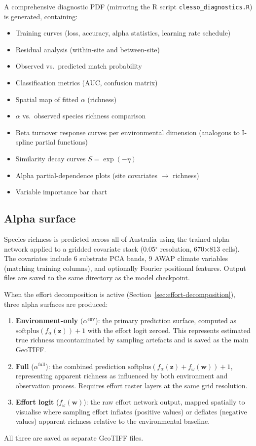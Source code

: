 \documentclass{article}
\begin{document}
A comprehensive diagnostic PDF (mirroring the R script \texttt{clesso\_diagnostics.R}) is generated, containing:
\begin{itemize}
    \item Training curves (loss, accuracy, alpha statistics, learning rate schedule)
    \item Residual analysis (within-site and between-site)
    \item Observed vs.\ predicted match probability
    \item Classification metrics (AUC, confusion matrix)
    \item Spatial map of fitted $\alpha$ (richness)
    \item $\alpha$ vs.\ observed species richness comparison
    \item Beta turnover response curves per environmental dimension (analogous to I-spline partial functions)
    \item Similarity decay curves $S = \exp(-\eta)$
    \item Alpha partial-dependence plots (site covariates $\to$ richness)
    \item Variable importance bar chart
\end{itemize}

\subsection{Alpha surface}

Species richness is predicted across all of Australia using the trained alpha network applied to a gridded covariate stack (0.05$^\circ$ resolution, 670$\times$813 cells). The covariates include 6 substrate PCA bands, 9 AWAP climate variables (matching training columns), and optionally Fourier positional features. Output files are saved to the same directory as the model checkpoint.

When the effort decomposition is active (Section~\ref{sec:effort-decomposition}), three alpha surfaces are produced:
\begin{enumerate}
    \item \textbf{Environment-only} ($\alpha^{\text{env}}$): the primary prediction surface, computed as $\text{softplus}(f_\alpha(\mathbf{z})) + 1$ with the effort logit zeroed. This represents estimated true richness uncontaminated by sampling artefacts and is saved as the main GeoTIFF.
    \item \textbf{Full} ($\alpha^{\text{full}}$): the combined prediction $\text{softplus}(f_\alpha(\mathbf{z}) + f_\omega(\mathbf{w})) + 1$, representing apparent richness as influenced by both environment and observation process. Requires effort raster layers at the same grid resolution.
    \item \textbf{Effort logit} ($f_\omega(\mathbf{w})$): the raw effort network output, mapped spatially to visualise where sampling effort inflates (positive values) or deflates (negative values) apparent richness relative to the environmental baseline.
\end{enumerate}
All three are saved as separate GeoTIFF files.
\end{document}
